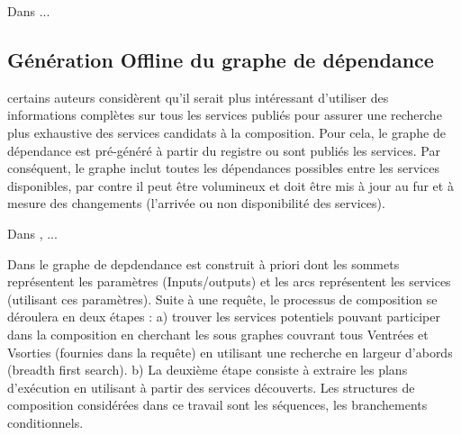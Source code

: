   \begin{text}

    Dans \cite{mahmoud2013towards} ... %
  \end{text}

  \subsection{Génération Offline du graphe de dépendance}
  \label{sec:gener-offline}

  \begin{text}
    certains auteurs considèrent qu'il serait plus intéressant
    d'utiliser des informations complètes sur tous les services
    publiés pour assurer une recherche plus exhaustive des services
    candidats à la composition. Pour cela, le graphe de dépendance
    est pré-généré à partir du registre ou sont publiés les
    services. Par conséquent, le graphe inclut toutes les dépendances
    possibles entre les services disponibles, par contre il peut être
    volumineux et doit être mis à jour au fur et à mesure des
    changements (l'arrivée ou non disponibilité des services).
  \end{text}

  \begin{text}
    Dans \cite{arpinar2005ontology}, ...
  \end{text}

  \begin{text}
    Dans \cite{hashemian2006graph} le graphe de depdendance est
    construit à priori dont les sommets représentent les paramètres
    (Inputs/outputs) et les arcs représentent les services (utilisant
    ces paramètres). Suite à une requête, le processus de composition
    se déroulera en deux étapes : a) trouver les services potentiels
    pouvant participer dans la composition en cherchant les sous
    graphes couvrant tous Ventrées et Vsorties (fournies dans la
    requête) en utilisant une recherche en largeur d'abords (breadth
    first search). b) La deuxième étape consiste à extraire les plans
    d'exécution en utilisant à partir des services découverts. Les
    structures de composition considérées dans ce travail sont les
    séquences, les branchements conditionnels.
  \end{text}

